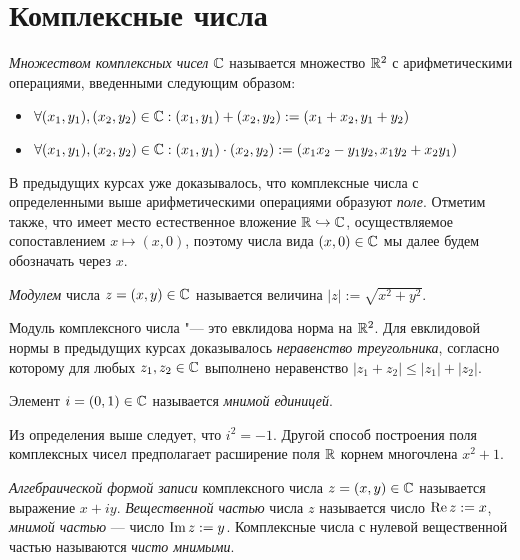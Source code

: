 \section{Комплексные числа}

\begin{definition}
	\textit{Множеством комплексных чисел} $\mathbb{C}$ называется множество $\mathbb{R}^2$ с арифметическими операциями, введенными следующим образом:
	\begin{itemize}
		\item $\forall (x_1, y_1), (x_2, y_2) \in \mathbb{C}: (x_1, y_1) + (x_2, y_2) := (x_1 + x_2, y_1 + y_2)$
		\item $\forall (x_1, y_1), (x_2, y_2) \in \mathbb{C}: (x_1, y_1)\cdot(x_2, y_2) := (x_1x_2 - y_1y_2, x_1y_2 + x_2y_1)$
	\end{itemize}
\end{definition}

\begin{note}
	В предыдущих курсах уже доказывалось, что комплексные числа с определенными выше арифметическими операциями образуют \textit{поле}. Отметим также, что имеет место естественное вложение $\mathbb{R} \hookrightarrow \mathbb{C}$, осуществляемое сопоставлением $x \mapsto (x, 0)$, поэтому числа вида $(x, 0) \in \mathbb{C}$ мы далее будем обозначать через $x$.
\end{note}

\begin{definition}
	\textit{Модулем} числа $z = (x, y) \in \mathbb{C}$ называется величина $|z| := \sqrt{x^2 + y^2}$.
\end{definition}

\begin{note}
	Модуль комплексного числа "--- это евклидова норма на $\mathbb{R}^2$. Для евклидовой нормы в предыдущих курсах доказывалось \textit{неравенство треугольника}, согласно которому для любых $z_1, z_2 \in \mathbb{C}$ выполнено неравенство $|z_1 + z_2| \le |z_1| + |z_2|$.
\end{note}

\begin{definition}
	Элемент $i = (0, 1) \in \mathbb{C}$ называется \textit{мнимой единицей}.
\end{definition}

\begin{note}
	Из определения выше следует, что $i^2 = -1$. Другой способ построения поля комплексных чисел предполагает расширение поля $\mathbb{R}$ корнем многочлена $x^2 + 1$.
\end{note}

\begin{definition}
	\textit{Алгебраической формой записи} комплексного числа $z = (x, y) \in \mathbb{C}$ называется выражение $x + iy$. \textit{Вещественной частью} числа $z$ называется число $\operatorname{Re}{z} := x$, \textit{мнимой частью} --- число $\operatorname{Im}{z} := y$. Комплексные числа с нулевой вещественной частью называются \textit{чисто мнимыми}.
\end{definition}

